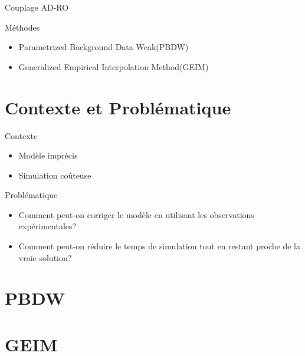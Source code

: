 \documentclass[a4paper,10pt]{beamer}
\numberwithin{equation}{section}
\begin{document}
\begin{frame}{\sc Couplage AD-RO}
\begin{block}{\sc Méthodes}
	\pause
	\begin{itemize}[<+->]
		\item Parametrized Background Data Weak(PBDW)
		\item Generalized Empirical Interpolation Method(GEIM)
	\end{itemize}
\end{block}
\end{frame}
\section{\sc Contexte et Problématique}


\begin{frame}
\begin{block}{\sc Contexte}
	\pause
	\begin{itemize}[<+->]
		\item Modèle imprécis
		\item Simulation coûteuse
	\end{itemize}
\pause
\end{block}

\begin{block}{\sc Problématique}
	\pause
	\begin{itemize}[<+->]
		\item Comment peut-on corriger le modèle en utilisant les observations expérimentales?
		\item Comment peut-on réduire le temps de simulation tout en restant proche de la vraie solution?
	\end{itemize}
\end{block}
\end{frame}

\section{\sc PBDW}


\section{\sc GEIM}
\begin{frame}

\end{frame}
\end{document}
